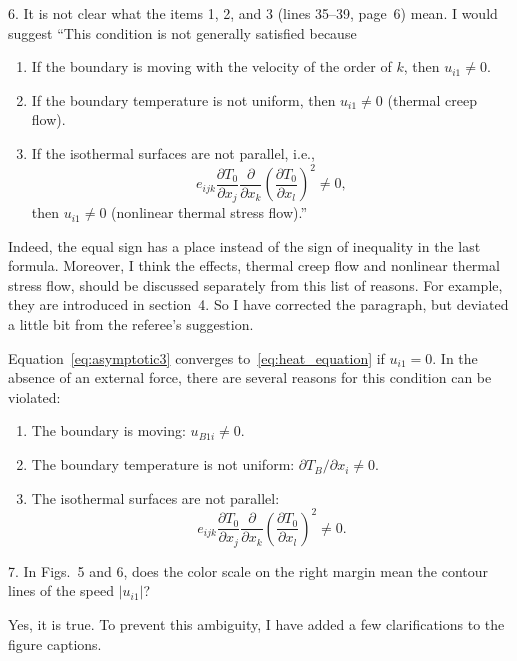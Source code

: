 \documentclass{article}
\newcommand{\pder}[2][]{\frac{\partial#1}{\partial#2}}
\newcommand{\Pder}[2][]{\partial#1/\partial#2}
\begin{document}
\begin{quoting}
6. It is not clear what the items 1, 2, and 3 (lines 35--39, page~6)
mean. I would suggest ``This condition is not generally satisfied because
\begin{enumerate}
\item If the boundary is moving with the velocity of the order of \(k\), then \(u_{i1} \neq 0\).
\item If the boundary temperature is not uniform, then \(u_{i1} \neq 0\) (thermal creep flow).
\item If the isothermal surfaces are not parallel, i.e.,
\[e_{ijk}\pder[T_0]{x_j}\pder{x_k}\left(\pder[T_0]{x_l}\right)^2 \neq 0, \]
then \(u_{i1} \neq 0\) (nonlinear thermal stress flow).''
\end{enumerate}
\end{quoting}

Indeed, the equal sign has a place instead of the sign of inequality in the last formula.
Moreover, I think the effects, thermal creep flow and nonlinear thermal stress flow, should
be discussed separately from this list of reasons. For example, they are introduced in section~4.
So I have corrected the paragraph, but deviated a little bit from the referee's suggestion.
\begin{leftbar}
Equation~\eqref{eq:asymptotic3} converges to~\eqref{eq:heat_equation} if \(u_{i1} = 0\).
In the absence of an external force, there are several reasons for this condition can be violated:
\begin{enumerate}
    \item The boundary is moving: \(u_{B1i} \neq 0 \).
    \item The boundary temperature is not uniform: \(\Pder[T_B]{x_i} \neq 0 \).
    \item The isothermal surfaces are not parallel:
        \begin{equation}\label{eq:equilibrium}
            e_{ijk}\pder[T_0]{x_j}\pder{x_k}\left(\pder[T_0]{x_l}\right)^2 \neq 0.
        \end{equation}
\end{enumerate}
\end{leftbar}

\begin{quoting}
7. In Figs.~5 and 6, does the color scale on the right margin mean the
contour lines of the speed \(|u_{i1}|\)?
\end{quoting}

Yes, it is true. To prevent this ambiguity, I have added a few clarifications to the figure captions.
\end{document}
